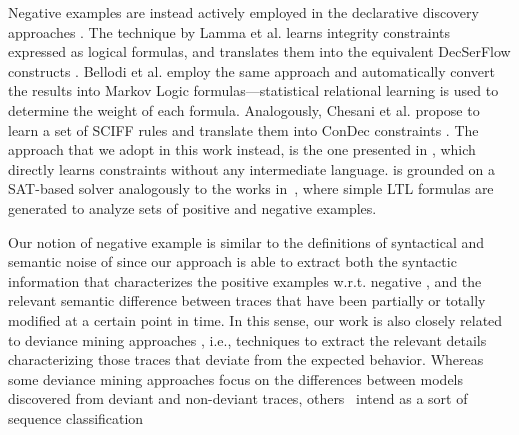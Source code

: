 Negative examples are instead actively employed in the declarative discovery approaches \cite{2007-Lamma,2007b-Lamma,2010-Bellodi,2016-Bellodi,2009-Chesani,deviant-tkde,DBLP:conf/bpm/SlaatsDB21}. 
The technique by Lamma et al. \cite{2007-Lamma,2007b-Lamma} learns integrity constraints expressed as logical formulas, and translates them into the equivalent DecSerFlow constructs \cite{2006-Aalst}. 
Bellodi et al. \cite{2010-Bellodi,2016-Bellodi} employ the same approach and automatically convert the results into Markov Logic formulas---statistical relational learning is used to determine the weight of each formula.
Analogously, Chesani et al. \cite{2009-Chesani} propose to learn a set of SCIFF rules \cite{2008-Alberti} and translate them into ConDec constraints \cite{2006-Pesic}. The approach that we adopt in this work instead, is the one presented in \cite{deviant-tkde}, which directly learns \declare constraints without any intermediate language.
 is grounded on a SAT-based solver analogously to the works in~\cite{2018-Neider,2019-Camacho,2019-Riener}, where simple \ac{LTL} formulas are generated to analyze sets of positive and negative examples.


Our notion of negative example is similar to the definitions of syntactical and semantic noise of \cite{2009-Gunther} since our approach is able to extract both the syntactic information that characterizes the positive examples w.r.t. negative , and the relevant semantic difference between traces that have been partially or totally modified at a certain point in time.
%
In this sense, our work is also closely related to deviance mining approaches \cite{2016-Nguyen,DBLP:journals/kbs/TaymouriRDM21}, i.e., techniques to extract the relevant details characterizing those traces %
that deviate from the expected behavior. Whereas some deviance mining approaches \cite{2014-Suriadi,2014-Armas} focus on the differences between models discovered from deviant and non-deviant traces, others~\cite{2013-Suriadi,2015-Partington,2013-Bose,2007-Lo,DBLP:journals/corr/abs-2111-12454} intend  %
 as a sort of sequence classification %


